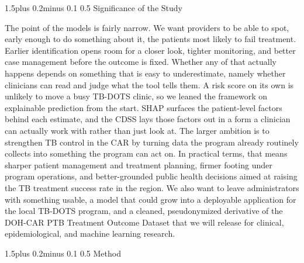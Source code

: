 \documentclass[12pt]{article}
\makeatletter
\renewcommand{\_}{\textunderscore\allowbreak}
\renewcommand{\section}{\@startsection{section}{1}{0pt}%
  {1.5\baselineskip plus 0.2\baselineskip minus 0.1\baselineskip}%
  {0.5\baselineskip}%
  {\centering\bfseries\normalsize}}
\renewcommand{\subsection}{\@startsection{subsection}{2}{0pt}%
  {1.5\baselineskip plus 0.2\baselineskip minus 0.1\baselineskip}%
  {0.5\baselineskip}%
  {\bfseries\normalsize}}
\makeatother
\begin{document}
\subsection{Significance of the Study}

The point of the models is fairly narrow. We want providers to be able to spot, early enough to do something about it, the patients most likely to fail treatment. Earlier identification opens room for a closer look, tighter monitoring, and better case management before the outcome is fixed. Whether any of that actually happens depends on something that is easy to underestimate, namely whether clinicians can read and judge what the tool tells them. A risk score on its own is unlikely to move a busy TB-DOTS clinic, so we leaned the framework on explainable prediction from the start. SHAP surfaces the patient-level factors behind each estimate, and the CDSS lays those factors out in a form a clinician can actually work with rather than just look at. The larger ambition is to strengthen TB control in the CAR by turning data the program already routinely collects into something the program can act on. In practical terms, that means sharper patient management and treatment planning, firmer footing under program operations, and better-grounded public health decisions aimed at raising the TB treatment success rate in the region. We also want to leave administrators with something usable, a model that could grow into a deployable application for the local TB-DOTS program, and a cleaned, pseudonymized derivative of the DOH-CAR PTB Treatment Outcome Dataset that we will release for clinical, epidemiological, and machine learning research.

\section{Method}
\end{document}
